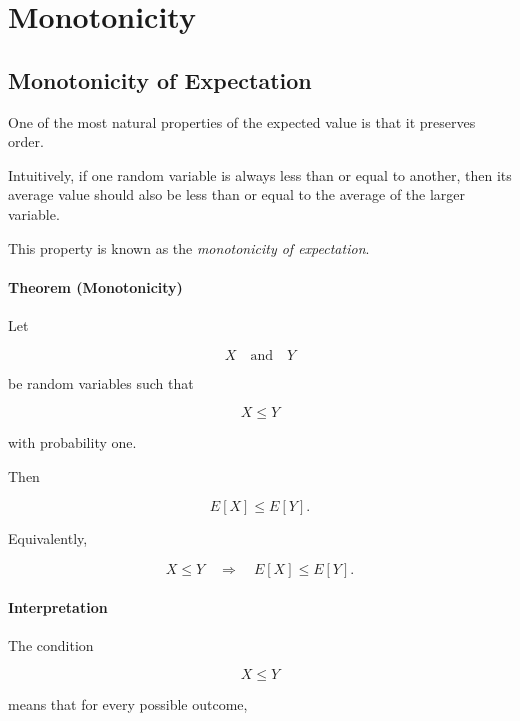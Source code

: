 \documentclass[11pt]{article}
\begin{document}
	
	\section{Monotonicity}
	\begin{mdframed}[
		linewidth=0.8pt,
		roundcorner=6pt,
		backgroundcolor=gray!5,
		linecolor=gray!60,
		innertopmargin=10pt,
		innerbottommargin=10pt,
		innerleftmargin=10pt,
		innerrightmargin=10pt
		]
		
		\subsection*{Monotonicity of Expectation}
		
		One of the most natural properties of the expected value is that it preserves
		order.
		
		Intuitively, if one random variable is always less than or equal to another,
		then its average value should also be less than or equal to the average of
		the larger variable.
		
		This property is known as the \emph{monotonicity of expectation}.
		
		\bigskip
		
		\paragraph{Theorem (Monotonicity)}
		
		Let
		
		\[
		X
		\quad\text{and}\quad
		Y
		\]
		
		be random variables such that
		
		\[
		X\le Y
		\]
		
		with probability one.
		
		Then
		
		\[
		\boxed{
			E[X]
			\le
			E[Y].
		}
		\]
		
		Equivalently,
		
		\[
		X\le Y
		\quad\Longrightarrow\quad
		E[X]\le E[Y].
		\]
		
		\bigskip
		
		\paragraph{Interpretation}
		
		The condition
		
		\[
		X\le Y
		\]
		
		means that for every possible outcome,
		

\end{mdframed}
\end{document}
